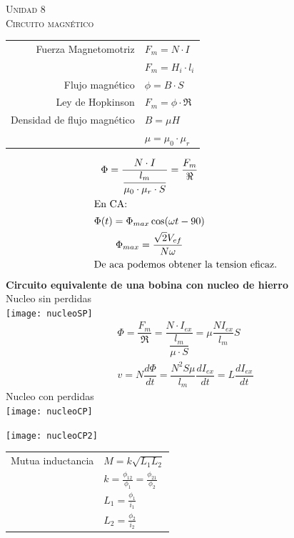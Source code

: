\documentclass[11pt,a4paper,twocolumn]{article}
\newcommand{\unidad}[2]{\begin{center}
		\fontsize{10}{10}\selectfont\color{gray!50!black}\scshape Unidad #1 \\
		\fontsize{14}{14}\selectfont \scshape #2
\end{center} \vspace{-.6cm}}
\begin{document}
	

\newpage
\unidad{8}{Circuito magnético}
\begin{cajita}
	\begin{center}
		
		\begin{tabular}{r l}
			Fuerza Magnetomotriz & $F_m = N \cdot I$ \\
								& $F_m = H_i \cdot l_i $\\
			Flujo magnético & $\phi = B \cdot S$ \\
			Ley de Hopkinson & $F_m = \phi \cdot \Re$ \\			
			Densidad de flujo magnético & $B = \mu H$\\
						& $\mu = \mu_{0} \cdot \mu_{r}$\\
		\end{tabular}
		

	\end{center}	

	\begin{gather*}
		\Phi=\dfrac{N \cdot I}{\dfrac{l_{m}}{\mu_{0} \cdot \mu_{r} \cdot S}}=\dfrac{F_m}{\Re} \\	
		\intertext{En CA:}		
		\Phi (t) = \Phi_{max} \cos(\omega t - 90) 	\\
		\Phi_{max} = \dfrac{\sqrt{2} V_{ef}}{N \omega}	\\
		\intertext{De aca podemos obtener la tension eficaz.}
	\end{gather*}
	\textbf{Circuito equivalente de una bobina con nucleo de hierro}\\
	\hspace{.5cm}Nucleo sin perdidas\\
	\texttt{[image: nucleoSP]}
	\begin{gather*}
		\Phi = \dfrac{F_m}{\Re} = \dfrac{N \cdot I_{ex}}{\dfrac{l_{m}}{\mu \cdot S}} = \mu \dfrac{N I_{ex}}{l_{m}} S\\
		v = N \dfrac{d \Phi}{dt} = \dfrac{N^{2} S \mu}{l_{m}} \dfrac{dI_{ex}}{dt} = L \dfrac{dI_{ex}}{dt}
	\end{gather*}
	\hspace{.5cm}Nucleo con perdidas\\
	\texttt{[image: nucleoCP]}
	\begin{center}
		\texttt{[image: nucleoCP2]}
	\end{center}

\begin{tabular}{r l}
	Mutua inductancia& $M=k\sqrt{L_1 L_2}$\\
					&$k=\frac{\phi_{12}}{\phi_{1}}=\frac{\phi_{21}}{\phi_{2}} $\\
					&$L_1=\frac{\phi_{1}}{i_{1}} $\\
					&$L_2=\frac{\phi_{2}}{i_{2}} $\\
\end{tabular}


\end{cajita}
\end{document}
